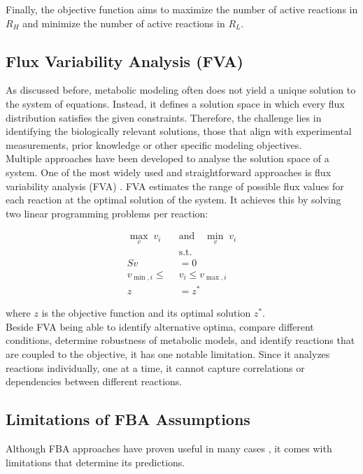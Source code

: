Finally, the objective function aims to maximize the number of active reactions in $R_H$ and minimize the number of active reactions in $R_L$. 

\subsection{Flux Variability Analysis (FVA)}
As discussed before, metabolic modeling often does not yield a unique solution to the system of equations. Instead, it defines a solution space in which every flux distribution satisfies the given constraints. Therefore, the challenge lies in identifying the biologically relevant solutions, those that align with experimental measurements, prior knowledge or other specific modeling objectives.
\\

Multiple approaches have been developed to analyse the solution space of a system. One of the most widely used and straightforward approaches is flux variability analysis (\gls{FVA}) \citep{mahadevanEffectsAlternateOptimal2003}.
FVA estimates the range of possible flux values for each reaction at the optimal solution of the system. It achieves this by solving two linear programming problems per reaction:


\begin{equation}
    \label{eq:FVA}
    \begin{aligned}
        \max_{v}\; v_i \quad & \text{and} \quad \min_{v}\; v_i \\
        &\text{s.t.} \\
        Sv &= 0 \\
        v_{\min,i} \le &v_i \le v_{\max,i}\\
        z&=z^*
    \end{aligned}
\end{equation}

where $z$ is the objective function and its optimal solution $z^*$.
\\

Beside FVA being able to identify alternative optima, compare different conditions, determine robustness of metabolic models, and identify reactions that are coupled to the objective, it has one notable limitation. Since it analyzes reactions individually, one at a time, it cannot capture correlations or dependencies between different reactions. 


\subsection{Limitations of FBA Assumptions}
Although FBA approaches have proven useful in many cases \citep{ozcanReconstructedMetabolicNetwork2016,SHLOMINetworkbasedPredictionHuman2008,mardinogluDefiningHumanAdipose2014,pagliariniSilicoModelingLiver2016},  it comes with limitations that determine its predictions. 
\\

